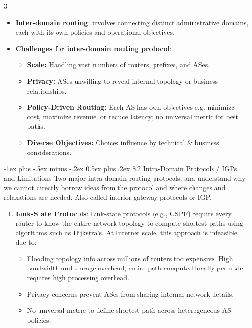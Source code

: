 \documentclass[a4paper, 9pt, landscape]{article}
\makeatletter
\renewcommand{\subsection}{\@startsection{subsubsection}{3}{0mm}%
                                {-1ex plus -.5ex minus -.2ex}%
                                {0.5ex plus .2ex}%
                                {\normalfont\small\bfseries}}
\makeatother
\begin{document}
\begin{multicols*}{3}
\begin{itemize}
	\item \textbf{Inter-domain routing}: involves connecting distinct administrative domains, each with its own policies and operational objectives.
    \item \textbf{Challenges for inter-domain routing protocol}:
\begin{itemize}
	\item  \textbf{Scale:} Handling vast numbers of routers, prefixes, and ASes.
    \item \textbf{Privacy:} ASes unwilling to reveal internal topology or business relationships.
    \item \textbf{Policy-Driven Routing:} Each AS has own objectives e.g. minimize cost, maximize revenue, or reduce latency; no universal metric for best paths.
    \item \textbf{Diverse Objectives:} Choices influence by technical \& business considerations.
\end{itemize}
\end{itemize}


\subsection{8.2 Intra-Domain Protocols / IGPs and Limitations}
Two major intra-domain routing protocols, and understand why we cannot directly borrow ideas from the protocol and where changes and relaxations are needed. Also called interior gateway protocols or IGP.
\begin{enumerate}
\item \textbf{Link-State Protocols}: Link-state protocols (e.g., OSPF) require every router to know the entire network topology to compute shortest paths using algorithms such as Dijkstra’s. At Internet scale, this approach is infeasible due to:
\begin{itemize}
    \item Flooding topology info across millions of routers too expensive. High bandwidth and storage overhead, entire path computed locally per node requires high processing overhead.
    \item Privacy concerns prevent ASes from sharing internal network details.
    \item No universal metric to define shortest path across heterogeneous AS policies.
\end{itemize}


\end{enumerate}
\end{multicols*}
\end{document}
